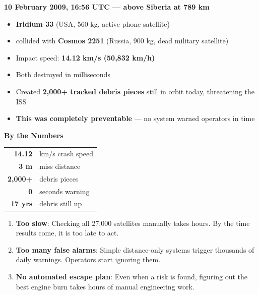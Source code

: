 \documentclass[11pt,a4paper]{article}
\begin{document}
\begin{crashbox}
\begin{minipage}[t]{0.56\textwidth}
\textbf{10 February 2009, 16:56 UTC --- above Siberia at 789 km}
\begin{itemize}[leftmargin=1em, itemsep=1pt]
  \item \textbf{Iridium 33} (USA, 560 kg, active phone satellite)
  \item collided with \textbf{Cosmos 2251} (Russia, 900 kg, dead military satellite)
  \item Impact speed: \textbf{14.12 km/s (50,832 km/h)}
  \item Both destroyed in milliseconds
  \item Created \textbf{2,000+ tracked debris pieces} still in orbit today, threatening the ISS
  \item \textbf{This was completely preventable} --- no system warned operators in time
\end{itemize}
\end{minipage}%
\hfill%
\begin{minipage}[t]{0.40\textwidth}
\vspace{0pt}
\begin{tcolorbox}[colback=spacered!12, colframe=spacered!60, left=4pt, right=4pt, top=4pt]
\centering
\textbf{\color{spacered}By the Numbers}\\[4pt]
\begin{tabular}{@{}rl@{}}
\textbf{14.12} & km/s crash speed \\
\textbf{3 m} & miss distance \\
\textbf{2,000+} & debris pieces \\
\textbf{0} & seconds warning \\
\textbf{17 yrs} & debris still up \\
\end{tabular}
\end{tcolorbox}
\end{minipage}
\end{crashbox}

\vspace{0.6em}

\begin{tcolorbox}[colback=gray!8, colframe=gray!30, title=\textbf{Why Existing Systems Are Not Enough}]
\begin{enumerate}[leftmargin=1.5em, itemsep=2pt]
  \item \textbf{Too slow}: Checking all 27,000 satellites manually takes hours. By the time results come, it is too late to act.
  \item \textbf{Too many false alarms}: Simple distance-only systems trigger thousands of daily warnings. Operators start ignoring them.
  \item \textbf{No automated escape plan}: Even when a risk is found, figuring out the best engine burn takes hours of manual engineering work.
\end{enumerate}
\end{tcolorbox}
\end{document}
